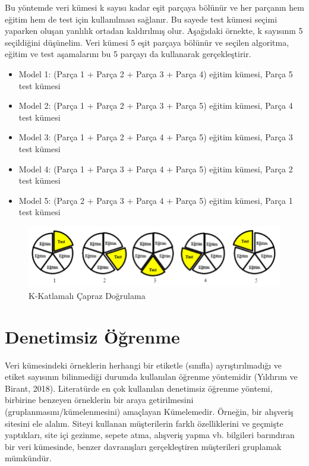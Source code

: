 \documentclass[12pt,twoside]{deuthesis}
\providecommand{\tightlist}{%
  \setlength{\itemsep}{0pt}\setlength{\parskip}{0pt}}
\begin{document}
Bu yöntemde veri kümesi k sayısı kadar eşit parçaya bölünür ve her parçanın hem eğitim hem de test için kullanılması sağlanır. Bu sayede test kümesi seçimi yaparken oluşan yanlılık ortadan kaldırılmış olur. Aşağıdaki örnekte, k sayısının 5 seçildiğini düşünelim. Veri kümesi 5 eşit parçaya bölünür ve seçilen algoritma, eğitim ve test aşamalarını bu 5 parçayı da kullanarak gerçekleştirir.
\begin{itemize}
\tightlist
\item
  Model 1: (Parça 1 + Parça 2 + Parça 3 + Parça 4) eğitim kümesi, Parça 5 test kümesi
\item
  Model 2: (Parça 1 + Parça 2 + Parça 3 + Parça 5) eğitim kümesi, Parça 4 test kümesi
\item
  Model 3: (Parça 1 + Parça 2 + Parça 4 + Parça 5) eğitim kümesi, Parça 3 test kümesi
\item
  Model 4: (Parça 1 + Parça 3 + Parça 4 + Parça 5) eğitim kümesi, Parça 2 test kümesi
\item
  Model 5: (Parça 2 + Parça 3 + Parça 4 + Parça 5) eğitim kümesi, Parça 1 test kümesi
\end{itemize}
\begin{figure}

{\centering \includegraphics[width=1\linewidth]{figure/kk} 

}

\caption{K-Katlamalı Çapraz Doğrulama}\label{fig:unnamed-chunk-2}
\end{figure}
\hypertarget{denetimsiz-uxf6ux11frenme}{%
\section{Denetimsiz Öğrenme}\label{denetimsiz-uxf6ux11frenme}}

Veri kümesindeki örneklerin herhangi bir etiketle (sınıfla) ayrıştırılmadığı ve etiket sayısının bilinmediği durumda kullanılan öğrenme yöntemidir (Yıldırım ve Birant, 2018). Literatürde en çok kullanılan denetimsiz öğrenme yöntemi, birbirine benzeyen örneklerin bir araya getirilmesini (gruplanmasını/kümelenmesini) amaçlayan Kümelemedir. Örneğin, bir alışveriş sitesini ele alalım. Siteyi kullanan müşterilerin farklı özelliklerini ve geçmişte yaptıkları, site içi gezinme, sepete atma, alışveriş yapma vb. bilgileri barındıran bir veri kümesinde, benzer davranışları gerçekleştiren müşterileri gruplamak mümkündür.
\end{document}
